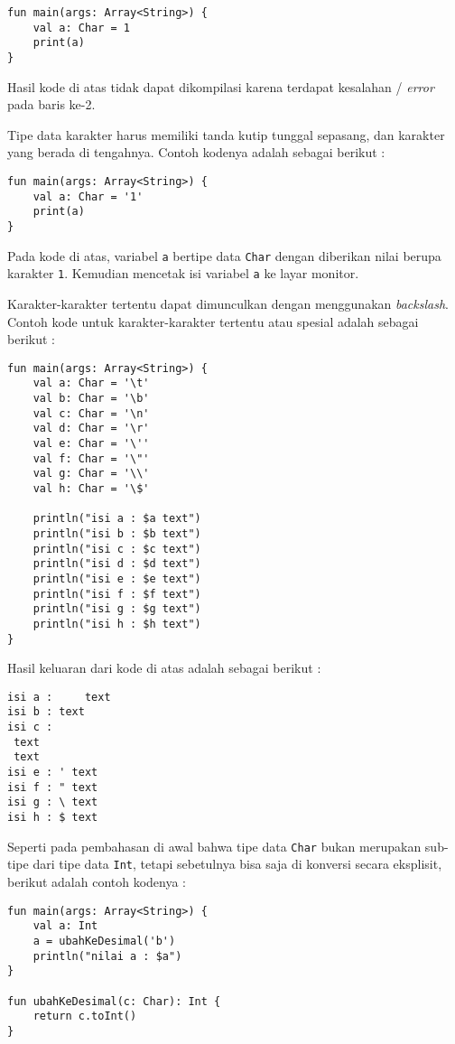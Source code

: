 \begin{lstlisting}
fun main(args: Array<String>) {
	val a: Char = 1
	print(a)
}
\end{lstlisting}

Hasil kode di atas tidak dapat dikompilasi karena terdapat kesalahan / \textit{error} pada baris ke-2. 

Tipe data karakter harus memiliki tanda kutip tunggal sepasang, dan karakter yang berada di tengahnya. Contoh kodenya adalah sebagai berikut :

\begin{lstlisting}
fun main(args: Array<String>) {
	val a: Char = '1'
	print(a)
}
\end{lstlisting}

Pada kode di atas, variabel \texttt{a} bertipe data \texttt{Char} dengan diberikan nilai berupa karakter \texttt{1}. Kemudian mencetak isi variabel \texttt{a} ke layar monitor.

Karakter-karakter tertentu dapat dimunculkan dengan menggunakan \textit{backslash}. Contoh kode untuk karakter-karakter tertentu atau spesial adalah sebagai berikut :

\begin{lstlisting}
fun main(args: Array<String>) {
	val a: Char = '\t'
	val b: Char = '\b'
	val c: Char = '\n'
	val d: Char = '\r'
	val e: Char = '\''
	val f: Char = '\"'
	val g: Char = '\\'
	val h: Char = '\$'
	
	println("isi a : $a text")
	println("isi b : $b text")
	println("isi c : $c text")
	println("isi d : $d text")
	println("isi e : $e text")
	println("isi f : $f text")
	println("isi g : $g text")
	println("isi h : $h text")
}
\end{lstlisting}

Hasil keluaran dari kode di atas adalah sebagai berikut :

\begin{lstlisting}
isi a : 	text
isi b : text
isi c : 
 text
 text
isi e : ' text
isi f : " text
isi g : \ text
isi h : $ text
\end{lstlisting}

Seperti pada pembahasan di awal bahwa tipe data \texttt{Char} bukan merupakan sub-tipe dari tipe data \texttt{Int}, tetapi sebetulnya bisa saja di konversi secara eksplisit, berikut adalah contoh kodenya :

\begin{lstlisting}
fun main(args: Array<String>) {
	val a: Int
	a = ubahKeDesimal('b')
	println("nilai a : $a")
}

fun ubahKeDesimal(c: Char): Int {
	return c.toInt()
}
\end{lstlisting}

